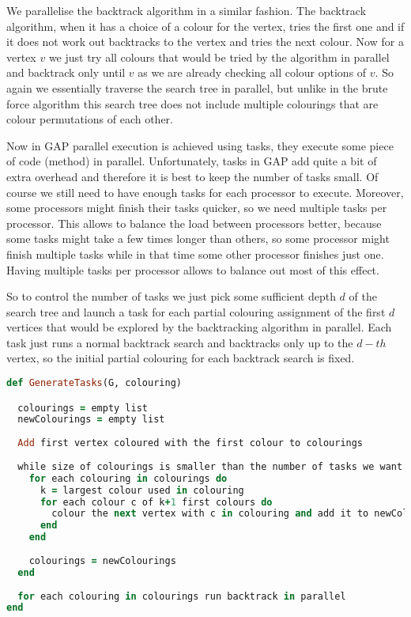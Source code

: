\documentclass{report}
\theoremstyle{plain}
\theoremstyle{definition}
\theoremstyle{remark}
\numberwithin{definition}{chapter}
\numberwithin{example}{chapter}
\numberwithin{figure}{chapter}
\numberwithin{theorem}{chapter}
\numberwithin{lemma}{chapter}
\begin{document}
We parallelise the backtrack algorithm in a similar fashion. The backtrack algorithm, when it has a choice of a colour for the vertex, tries the first one and if it does not work out backtracks to the vertex and tries the next colour. Now for a vertex $v$ we just try all colours that would be tried by the algorithm in parallel and backtrack only until $v$ as we are already checking all colour options of $v$. So again we essentially traverse the search tree in parallel, but unlike in the brute force algorithm this search tree does not include multiple colourings that are colour permutations of each other.

Now in GAP parallel execution is achieved using tasks, they execute some piece of code (method) in parallel. Unfortunately, tasks in GAP add quite a bit of extra overhead and therefore it is best to keep the number of tasks small. Of course we still need to have enough tasks for each processor to execute. Moreover, some processors might finish their tasks quicker, so we need multiple tasks per processor. This allows to balance the load between processors better, because some tasks might take a few times longer than others, so some processor might finish multiple tasks while in that time some other processor finishes just one. Having multiple tasks per processor allows to balance out most of this effect.

So to control the number of tasks we just pick some sufficient depth $d$ of the search tree and launch a task for each partial colouring assignment of the first $d$ vertices that would be explored by the backtracking algorithm in parallel. Each task just runs a normal backtrack search and backtracks only up to the $d-th$ vertex, so the initial partial colouring for each backtrack search is fixed.

\begin{lstlisting}[language=Ruby]
def GenerateTasks(G, colouring)

  colourings = empty list
  newColourings = empty list
  
  Add first vertex coloured with the first colour to colourings
  
  while size of colourings is smaller than the number of tasks we want do
    for each colouring in colourings do
      k = largest colour used in colouring
      for each colour c of k+1 first colours do
        colour the next vertex with c in colouring and add it to newColourings
      end
    end
    
    colourings = newColourings
  end
  
  for each colouring in colourings run backtrack in parallel
end
\end{lstlisting}
\end{document}
